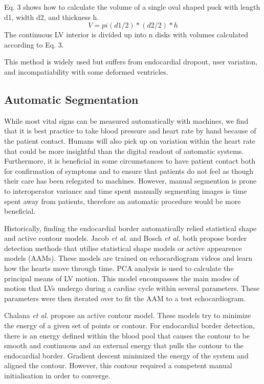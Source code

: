 \documentclass[12pt]{article}
\begin{document}
Eq. 3 shows how to calculate the volume of a single oval shaped puck with length d1, width d2, and thickness h\cite{are_length_method_webpage}.
\begin{equation}
	V = pi(d1/2)*(d2/2)*h
\end{equation}
The continuous LV interior is divided up into n disks with volumes calculated according to Eq. 3.

This method is widely used but suffers from endocardial dropout, user variation, and incompatiability with some deformed ventricles.\cite{cardiac_chamber_quant_update}
\par

\subsection{Automatic Segmentation}
While most vital signs can be measured automatically with machines, we
find that it is best practice to take blood pressure and heart rate by hand because of the patient contact\cite{obs_guidelines}.
Humans will also pick up on variation within the heart rate that could be more insightful than the digital readout of automatic systems.
Furthermore, it is beneficial in some circumstances to have patient contact both for confirmation of symptoms and to ensure that patients do not feel as though their care has been relegated to machines.
However, manual segmention is prone to interoperator variance\cite{jacc_ef_p_and_c} and time spent manually segmenting images is time spent away from patients, therefore an automatic procedure would be more beneficial.

Historically, finding the endocardial border automatically relied statistical shape and active contour models.
Jacob \textit{ et al.} \cite{robust_contour_jacob} and Bosch \textit{et al.}\cite{bosch} both propose border detection methods that utilise statistical shape models or active appearence models (AAMs).
These models are trained on echocardiogram videos and learn how the hearts move through time.
PCA analysis is used to calculate the principal means of LV motion.
This model encompasses the main modes of motion that LVs undergo during a cardiac cycle within several parameters.
These parameters were then iterated over to fit the AAM to a test echocardiogram.

Chalana \textit{et al.}\cite{snakes_contour} propose an active contour model. These models try to minimize the energy of a given set of points or contour. 
For endocardial border detection, there is an energy defined within the blood pool that causes the contour to be smooth and continuous and an external energy that pulls the contour to the endocardial border.
Gradient descent minimized the energy of the system and aligned the contour.
However, this contour required a competent manual initialisation in order to converge.
\end{document}
